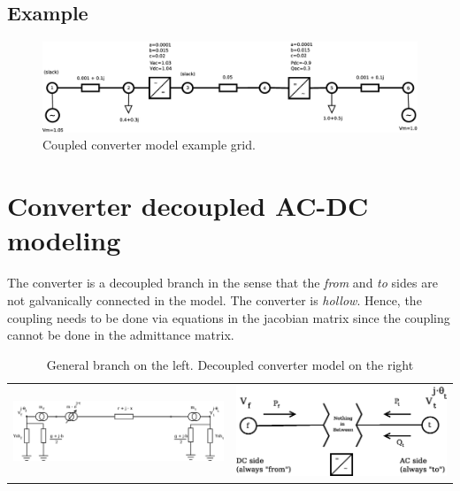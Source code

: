 \documentclass[11pt]{article}
\begin{document}
	\subsection{Example}
	
	\begin{figure}[h!]
		\centering
		\includegraphics[width=1.0\linewidth]{acdc_6bus_diagram_fubm}
		\caption{Coupled converter model example grid.}
		\label{fig:acdc6busdiagram_fubm}
	\end{figure}

	

	\newpage
	\section{Converter decoupled AC-DC modeling}
	
	The converter is a decoupled branch in the sense that the \textit{from} and \textit{to} sides are not galvanically connected in the model. The converter is \textit{hollow}. Hence, the coupling needs to be done via equations in the jacobian matrix since the coupling cannot be done in the admittance matrix.
	
	\begin{table}[h!]
	\begin{tabular}{cc} %
		\includegraphics[width=0.65\linewidth]{branch.eps} &
		\includegraphics[width=0.35\linewidth]{decoupled_converter_model.eps} \\
	\end{tabular}
	\caption{General branch on the left. Decoupled converter model on the right}
	\label{table:branch_and_converter}
	\end{table}
	
\end{document}
